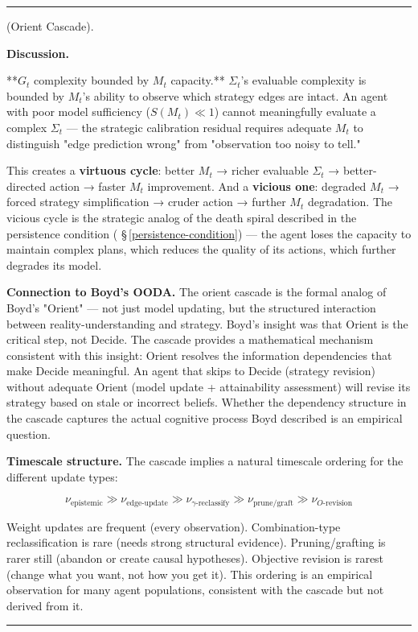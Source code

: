 \documentclass[11pt,oneside]{article}
\newcounter{claim}[section]
\renewcommand{\theclaim}{\thesection.\arabic{claim}}
\newenvironment{segment}[2]{%
  \refstepcounter{claim}%
  \bigskip\noindent\hrule\smallskip
  \noindent{\bfseries #1~\theclaim}\enskip(#2).\par\smallskip
  \noindent\ignorespaces
}{%
  \par\smallskip\noindent\hrule\bigskip
}
\newenvironment{proposition}[1][]{\begin{segment}{Proposition}{#1}}{\end{segment}}
\begin{document}
\begin{proposition}[Orient Cascade]
\medskip\noindent\textbf{Discussion.}


**$G_t$ complexity bounded by $M_t$ capacity.** $\Sigma_t$'s evaluable complexity is bounded by $M_t$'s ability to observe which strategy edges are intact. An agent with poor model sufficiency ($S(M_t) \ll 1$) cannot meaningfully evaluate a complex $\Sigma_t$ — the strategic calibration residual requires adequate $M_t$ to distinguish "edge prediction wrong" from "observation too noisy to tell."

This creates a \textbf{virtuous cycle}: better $M_t$ → richer evaluable $\Sigma_t$ → better-directed action → faster $M_t$ improvement. And a \textbf{vicious one}: degraded $M_t$ → forced strategy simplification → cruder action → further $M_t$ degradation. The vicious cycle is the strategic analog of the death spiral described in the persistence condition ( \S\,\ref{persistence-condition}) — the agent loses the capacity to maintain complex plans, which reduces the quality of its actions, which further degrades its model.

\textbf{Connection to Boyd's OODA.} The orient cascade is the formal analog of Boyd's "Orient" — not just model updating, but the structured interaction between reality-understanding and strategy. Boyd's insight was that Orient is the critical step, not Decide. The cascade provides a mathematical mechanism consistent with this insight: Orient resolves the information dependencies that make Decide meaningful. An agent that skips to Decide (strategy revision) without adequate Orient (model update + attainability assessment) will revise its strategy based on stale or incorrect beliefs. Whether the dependency structure in the cascade captures the actual cognitive process Boyd described is an empirical question.

\textbf{Timescale structure.} The cascade implies a natural timescale ordering for the different update types:

$$\nu_{\text{epistemic}} \gg \nu_{\text{edge-update}} \gg \nu_{\gamma\text{-reclassify}} \gg \nu_{\text{prune/graft}} \gg \nu_{O\text{-revision}}$$

Weight updates are frequent (every observation). Combination-type reclassification is rare (needs strong structural evidence). Pruning/grafting is rarer still (abandon or create causal hypotheses). Objective revision is rarest (change what you want, not how you get it). This ordering is an empirical observation for many agent populations, consistent with the cascade but not derived from it.

\end{proposition}
\end{document}
